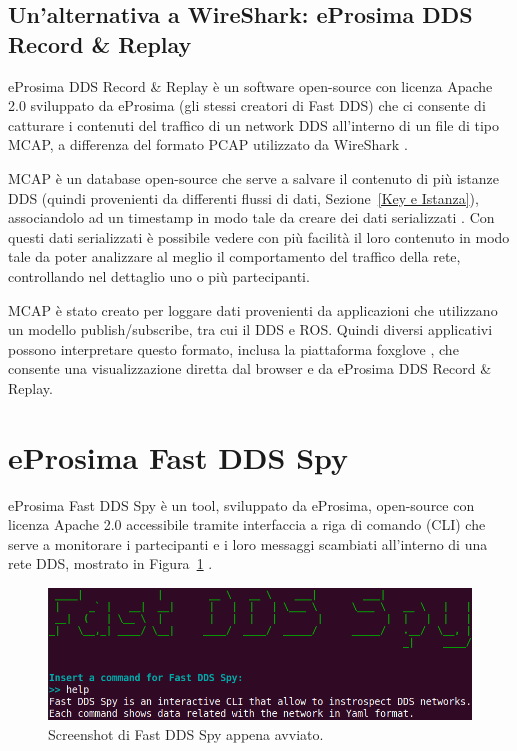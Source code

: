 \subsection{Un'alternativa a WireShark: eProsima DDS Record \& Replay}
eProsima DDS Record \& Replay è un software open-source con licenza 
Apache 2.0 sviluppato da eProsima (gli stessi creatori di Fast DDS) che 
ci consente di catturare i contenuti del traffico di un network DDS
all'interno di un file di tipo MCAP, a differenza del formato PCAP 
utilizzato da WireShark \cite{eProsimaDDSRecordeReplayDocumentation}.

MCAP è un database open-source che serve a salvare il contenuto 
di più istanze DDS (quindi provenienti da differenti flussi di dati, 
Sezione~\ref{Key e Istanza}), associandolo
ad un timestamp in modo tale da creare dei dati serializzati
\cite{mcap}.
Con questi dati serializzati è possibile vedere con più facilità 
il loro contenuto in modo tale da poter analizzare al meglio
il comportamento del traffico della rete, controllando nel dettaglio 
uno o più partecipanti.   

MCAP è stato creato per loggare dati provenienti da applicazioni 
che utilizzano un modello publish/subscribe, tra cui il DDS e ROS.
Quindi diversi applicativi possono interpretare questo formato, 
inclusa la piattaforma 
foxglove \cite{foxglove}, 
che consente una visualizzazione diretta dal browser e da
eProsima DDS Record \& Replay.


\section{eProsima Fast DDS Spy}
eProsima Fast DDS Spy è un tool, sviluppato da eProsima, 
open-source con licenza Apache 2.0 accessibile
tramite interfaccia a riga di comando (CLI) che serve a
monitorare i partecipanti
e i loro messaggi scambiati all'interno di una rete DDS,
mostrato in Figura~\ref{fastddsspyintro} \cite{FastDDSSpy}. 

\begin{figure}[H]
    \centering
    \includegraphics[width=15.2cm, keepaspectratio]{img/fastddsspyintro.png}
    \caption{Screenshot di Fast DDS Spy appena avviato.}
    \label{fastddsspyintro}
\end{figure}


